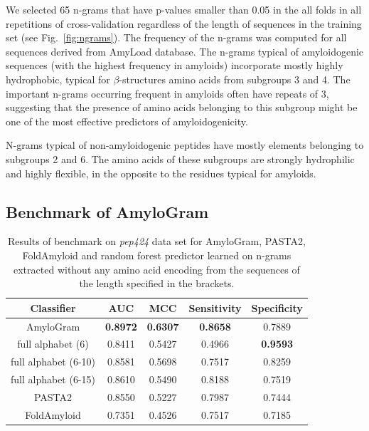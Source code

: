 \documentclass{bioinfo}
\begin{document}
  We selected 65 n-grams that have p-values smaller than 0.05 in the all folds in 
all repetitions of cross-validation regardless of the length of sequences in the 
training set (see Fig.~\ref{fig:ngrams}). The frequency of the n-grams was 
computed for all sequences derived from AmyLoad database. The n-grams typical 
of amyloidogenic sequences (with the highest frequency in amyloids) incorporate 
mostly highly hydrophobic, typical for $\beta$-structures amino acids from 
subgroups 3 and 4. The important n-grams occurring frequent in amyloids often 
have repeats of 3, suggesting that the presence of amino acids belonging to this 
subgroup might be one of the most effective predictors of amyloidogenicity.

  N-grams typical of non-amyloidogenic peptides have mostly elements 
belonging to subgroups 2 and 6. The amino acids of these subgroups are strongly 
hydrophilic and highly flexible, in the opposite to the residues typical for 
amyloids.

\subsection{Benchmark of AmyloGram}

\begin{table}[ht]
\centering
\caption{Results of benchmark on \textit{pep424} data set for AmyloGram, 
PASTA2, FoldAmyloid and random forest predictor learned on n-grams extracted 
without any amino acid encoding from the sequences of the length specified in 
the brackets.} 
\label{tab:bench_summary}
\begin{tabular}{ccccc}
  \toprule
Classifier & AUC & MCC & Sensitivity & Specificity \\ 
  \midrule
AmyloGram & \textbf{0.8972} & \textbf{0.6307} & \textbf{0.8658} & 0.7889 \\ 
   \rowcolor[gray]{0.85}full alphabet (6) & 0.8411 & 0.5427 & 0.4966 & 
\textbf{0.9593} \\ 
  full alphabet (6-10) & 0.8581 & 0.5698 & 0.7517 & 0.8259 \\ 
   \rowcolor[gray]{0.85}full alphabet (6-15) & 0.8610 & 0.5490 & 0.8188 & 
0.7519 \\ 
\hline \hline
   PASTA2 & 0.8550 & 0.5227 & 0.7987 & 0.7444 \\ 
  \rowcolor[gray]{0.85}FoldAmyloid & 0.7351 & 0.4526 & 0.7517 & 0.7185 \\ 

   \bottomrule
\end{tabular}
\end{table}
\end{document}
